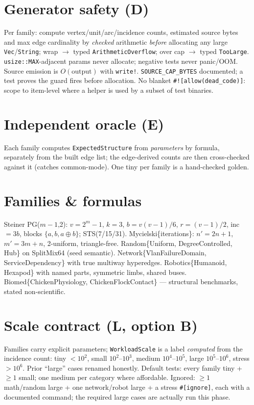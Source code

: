 \documentclass[11pt]{article}
\begin{document}
\section{Generator safety (D)}
Per family: compute vertex/unit/arc/incidence counts, estimated source bytes and
max edge cardinality by \emph{checked} arithmetic \emph{before} allocating any
large \texttt{Vec}/\texttt{String}; wrap $\to$ typed \texttt{ArithmeticOverflow};
over cap $\to$ typed \texttt{TooLarge}. \texttt{usize::MAX}-adjacent params never
allocate; negative tests never panic/OOM. Source emission is $O(\text{output})$
with \texttt{write!}. \texttt{SOURCE\_CAP\_BYTES} documented; a test proves the
guard fires before allocation. No blanket \texttt{\#![allow(dead\_code)]}: scope
to item-level where a helper is used by a subset of test binaries.

\section{Independent oracle (E)}
Each family computes \texttt{ExpectedStructure} from \emph{parameters} by formula,
separately from the built edge list; the edge-derived counts are then cross-checked
against it (catches common-mode). One tiny per family is a hand-checked golden.

\section{Families \& formulas}
Steiner PG($m{-}1$,2): $v=2^m{-}1$, $k=3$, $b=v(v{-}1)/6$, $r=(v{-}1)/2$,
inc$=3b$, blocks $\{a,b,a\oplus b\}$; STS(7/15/31). Mycielski\{iterations\}:
$n'=2n{+}1$, $m'=3m{+}n$, 2-uniform, triangle-free. Random\{Uniform,
DegreeControlled, Hub\} on SplitMix64 (seed semantic). Network\{VlanFailureDomain,
ServiceDependency\} with true multiway hyperedges. Robotics\{Humanoid, Hexapod\}
with named parts, symmetric limbs, shared buses. Biomed\{ChickenPhysiology,
ChickenFlockContact\} --- structural benchmarks, stated non-scientific.

\section{Scale contract (L, option B)}
Families carry explicit parameters; \texttt{WorkloadScale} is a label
\emph{computed} from the incidence count: tiny $<10^2$, small $10^2$--$10^3$,
medium $10^4$--$10^5$, large $10^5$--$10^6$, stress $>10^6$. Prior ``large'' cases
renamed honestly. Default tests: every family tiny + $\ge1$ small; one medium per
category where affordable. Ignored: $\ge1$ math/random large + one network/robot
large + a stress \texttt{\#[ignore]}, each with a documented command; the required
large cases are actually run this phase.
\end{document}
